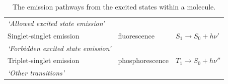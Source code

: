 \documentclass[
]{book}
\begin{document}
\begin{longtable}[]{@{}lll@{}}
\caption{\label{tab:photoem} The emission pathways from the excited states within a molecule.}\tabularnewline
\toprule
\endhead
\begin{minipage}[t]{0.35\columnwidth}\raggedright
\emph{`Allowed excited state emission'}\strut
\end{minipage} & \begin{minipage}[t]{0.33\columnwidth}\raggedright
\strut
\end{minipage} & \begin{minipage}[t]{0.23\columnwidth}\raggedright
\strut
\end{minipage}\tabularnewline
\begin{minipage}[t]{0.35\columnwidth}\raggedright
Singlet-singlet emission\strut
\end{minipage} & \begin{minipage}[t]{0.33\columnwidth}\raggedright
fluorescence\strut
\end{minipage} & \begin{minipage}[t]{0.23\columnwidth}\raggedright
\(S_1 \longrightarrow S_0 + h \nu '\)\strut
\end{minipage}\tabularnewline
\begin{minipage}[t]{0.35\columnwidth}\raggedright
\emph{`Forbidden excited state emission'}\strut
\end{minipage} & \begin{minipage}[t]{0.33\columnwidth}\raggedright
\strut
\end{minipage} & \begin{minipage}[t]{0.23\columnwidth}\raggedright
\strut
\end{minipage}\tabularnewline
\begin{minipage}[t]{0.35\columnwidth}\raggedright
Triplet-singlet emission\strut
\end{minipage} & \begin{minipage}[t]{0.33\columnwidth}\raggedright
phosphorescence\strut
\end{minipage} & \begin{minipage}[t]{0.23\columnwidth}\raggedright
\(T_1 \longrightarrow S_0 + h \nu ''\)\strut
\end{minipage}\tabularnewline
\begin{minipage}[t]{0.35\columnwidth}\raggedright
\emph{`Other transitions'}\strut
\end{minipage} & \begin{minipage}[t]{0.33\columnwidth}\raggedright
\strut

\end{minipage}
\end{longtable}
\end{document}
